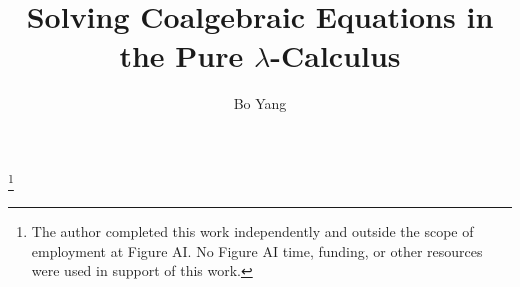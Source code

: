 \newcommand{\TODO}[1]{\textcolor{red}{[\textbf{TODO:} #1]}}
\newcommand{\citeTODO}[1]{\textcolor{red}{[\textbf{cite:} #1]}}

\newcommand{\Set}{\mathbf{Set}}
\newcommand{\Beh}{B}                         %
\newcommand{\rfp}{\varrho}                   %
\newcommand{\behav}{\mathsf{beh}}            %
\newcommand{\outm}{\mathsf{out}}             %
\newcommand{\stepm}{e}                       %
\newcommand{\Delaym}{\mathsf{Delay}}
\newcommand{\Pow}{\mathcal{P}}
\newcommand{\iter}[1]{#1^{\dagger}}          %

\newcommand{\Sh}{\mathsf{Sh}}
\newcommand{\Lamsh}{\mathsf{Lam}}
\newcommand{\Appsh}{\mathsf{App}}
\newcommand{\Varsh}{\mathsf{Var}}
\newcommand{\dlam}{\mathord{\downarrow}\lambda}
\newcommand{\dhead}{\mathord{\downarrow}\mathsf{h}}
\newcommand{\darg}{\mathord{\downarrow}\mathsf{a}}
\newcommand{\subt}[2]{#1\!\downarrow\!#2}
\newcommand{\reduces}{\twoheadrightarrow}
\newcommand{\bred}{\rightarrow_{\beta}}
\newcommand{\present}{\mathtt{present}}




\title{Solving Coalgebraic Equations in the Pure $\lambda$-Calculus}

\author{Bo Yang}
\thanks{The author completed this work independently and outside the scope of employment at Figure AI. No Figure AI time, funding, or other resources were used in support of this work.}

